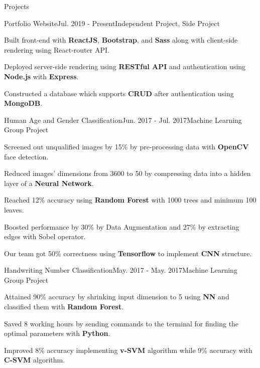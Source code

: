 \documentclass{resume} %
\begin{document}
\begin{rSection}{Projects}

\begin{rSubsection}{Portfolio Website}{Jul. 2019 - Present}{Independent Project, Side Project}{}
\item Built front-end with \textbf{ReactJS}, \textbf{Bootstrap}, and \textbf{Sass} along with client-side rendering using React-router API.
\item Deployed server-side rendering using \textbf{RESTful API} and authentication using \textbf{Node.js} with \textbf{Express}.
\item Constructed a database which supports \textbf{CRUD} after authentication
using \textbf{MongoDB}.
\end{rSubsection}

\begin{rSubsection}{Human Age and Gender Classification}{Jun. 2017 - Jul. 2017}{Machine Learning Group Project}{}
\item Screened out unqualified images by 15\% by pre-processing data with \textbf{OpenCV} face detection. 
\item Reduced images' dimensions from 3600 to 50 by compressing data into a hidden layer of a \textbf{Neural Network}.
\item Reached 12\% accuracy using \textbf{Random Forest} with 1000 trees and minimum 100 leaves.
\item Boosted performance by 30\% by Data Augmentation and 27\% by extracting edges with Sobel operator.
\item Our team got 50\% correctness using \textbf{Tensorflow} to implement \textbf{CNN} structure.
\end{rSubsection}
 
\begin{rSubsection}{Handwriting Number Classification}{May. 2017 - May. 2017}{Machine Learning Group Project}{}
\item Attained 90\% accuracy by shrinking input dimension to 5 using \textbf{NN} and classified them with \textbf{Random Forest}. 
\item Saved 8 working hours by sending commands to the terminal for finding the optimal parameters with \textbf{Python}.
\item Improved 8\% accuracy implementing \textbf{v-SVM} algorithm while 9\% accuracy with \textbf{C-SVM} algorithm.

\end{rSubsection}
 
\end{rSection}
\end{document}
